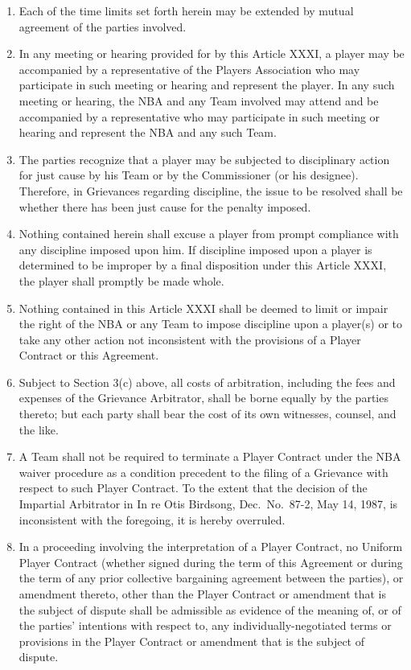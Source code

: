\documentclass[
]{book}
\providecommand{\tightlist}{%
  \setlength{\itemsep}{0pt}\setlength{\parskip}{0pt}}
\begin{document}
\begin{enumerate}
\def\labelenumi{(\alph{enumi})}
\tightlist
\item
  Each of the time limits set forth herein may be extended by mutual agreement of the parties involved.
\item
  In any meeting or hearing provided for by this Article XXXI, a player may be accompanied by a representative of the Players Association who may participate in such meeting or hearing and represent the player. In any such meeting or hearing, the NBA and any Team involved may attend and be accompanied by a representative who may participate in such meeting or hearing and represent the NBA and any such Team.
\item
  The parties recognize that a player may be subjected to disciplinary action for just cause by his Team or by the Commissioner (or his designee). Therefore, in Grievances regarding discipline, the issue to be resolved shall be whether there has been just cause for the penalty imposed.
\item
  Nothing contained herein shall excuse a player from prompt compliance with any discipline imposed upon him. If discipline imposed upon a player is determined to be improper by a final disposition under this Article XXXI, the player shall promptly be made whole.
\item
  Nothing contained in this Article XXXI shall be deemed to limit or impair the right of the NBA or any Team to impose discipline upon a player(s) or to take any other action not inconsistent with the provisions of a Player Contract or this Agreement.
\item
  Subject to Section 3(c) above, all costs of arbitration, including the fees and expenses of the Grievance Arbitrator, shall be borne equally by the parties thereto; but each party shall bear the cost of its own witnesses, counsel, and the like.
\item
  A Team shall not be required to terminate a Player Contract under the NBA waiver procedure as a condition precedent to the filing of a Grievance with respect to such Player Contract. To the extent that the decision of the Impartial Arbitrator in In re Otis Birdsong, Dec.~No.~87-2, May 14, 1987, is inconsistent with the foregoing, it is hereby overruled.
\item
  In a proceeding involving the interpretation of a Player Contract, no Uniform Player Contract (whether signed during the term of this Agreement or during the term of any prior collective bargaining agreement between the parties), or amendment thereto, other than the Player Contract or amendment that is the subject of dispute shall be admissible as evidence of the meaning of, or of the parties' intentions with respect to, any individually-negotiated terms or provisions in the Player Contract or amendment that is the subject of dispute.
\end{enumerate}
\end{document}
